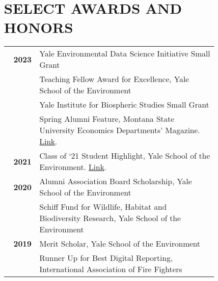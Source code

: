 \documentclass[11pt]{article}
\begin{document}
\section*{SELECT AWARDS AND HONORS}
\begin{longtable}{>{\bfseries}r p{0.85\linewidth}} %
2023 & Yale Environmental Data Science Initiative Small Grant \\
    & Teaching Fellow Award for Excellence, Yale School of the Environment \\
        & Yale Institute for Biospheric Studies Small Grant \\
        & Spring Alumni Feature, Montana State University Economics Departments’ Magazine. \href{https://www.montana.edu/econ/newsletters/Spring23NewsletterforWeb.pdf}{Link}. \\[1ex]
2021 & Class of ‘21 Student Highlight, Yale School of the Environment. \href{https://environment.yale.edu/news/article/andie-creel-putting-a-value-on-natural-resources?fbclid=IwAR1W1Rz9sNbyTzKgDEBLVM3TMJjhzOWkP5_6f4-cbtQmrNaF4BSW2MLQHGo}{Link}. \\[1ex]
2020 & Alumni Association Board Scholarship, Yale School of the Environment \\
    & Schiff Fund for Wildlife, Habitat and Biodiversity Research, Yale School of the Environment \\[1ex]
2019 & Merit Scholar, Yale School of the Environment \\
    & Runner Up for Best Digital Reporting, International Association of Fire Fighters \\[1ex]

\end{longtable}
\end{document}
